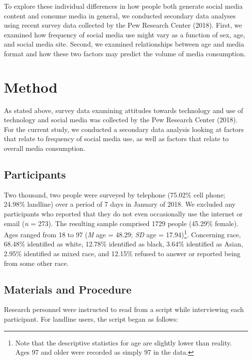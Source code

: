 \documentclass[man, fleqn, noextraspace]{apa6}
\let\rmarkdownfootnote\footnote%
\def\footnote{\protect\rmarkdownfootnote}
\theoremstyle{definition}
\theoremstyle{definition}
\theoremstyle{definition}
\theoremstyle{remark}
\begin{document}
To explore these individual differences in how people both generate
social media content and consume media in general, we conducted
secondary data analyses using recent survey data collected by the Pew
Research Center (2018). First, we examined how frequency of social media
use might vary as a function of sex, age, and social media site. Second,
we examined relationships between age and media format and how these two
factors may predict the volume of media consumption.

\section{Method}\label{method}

As stated above, survey data examining attitudes towards technology and
use of technology and social media was collected by the Pew Research
Center (2018). For the current study, we conducted a secondary data
analysis looking at factors that relate to frequency of social media
use, as well as factors that relate to overall media consumption.

\subsection{Participants}\label{participants}

Two thousand, two people were surveyed by telephone (75.02\% cell phone;
24.98\% landline) over a period of 7 days in January of 2018. We
excluded any participants who reported that they do not even
occasionally use the internet or email (\emph{n} = 273). The resulting
sample comprised 1729 people (45.29\% female). Ages ranged from 18 to 97
(\emph{M} age = 48.29; \emph{SD} age =
17.94)\footnote{Note that the descriptive statistics for age are slightly lower than reality. Ages 97 and older were recorded as simply 97 in the data.}.
Concerning race, 68.48\% identified as white, 12.78\% identified as
black, 3.64\% identified as Asian, 2.95\% identified as mixed race, and
12.15\% refused to answer or reported being from some other race.

\subsection{Materials and Procedure}\label{materials-and-procedure}

Research personnel were instructed to read from a script while
interviewing each participant. For landline users, the script began as
follows:
\end{document}
